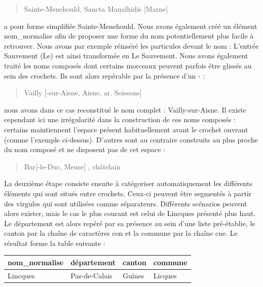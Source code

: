 \documentclass[a4paper,12pt,twoside]{book}
\begin{document}
	\begin{quotation}
		Sainte-Menehould, Sancta Manalhidis [Marne]
	\end{quotation}

	\noindent a pour forme simplifiée \og Sainte-Menehould\fg{}. Nous avons également créé un élément \og nom\_normalise\fg{} afin de proposer une forme du nom potentiellement plus facile à retrouver. Nous avons par exemple réinséré les particules devant le nom : L'entrée \og Sauvement (Le)\fg{} est ainsi transformée en \og Le Sauvement\fg{}. Nous avons également traité les noms composés dont certains morceaux peuvent parfois être glissés au sein des crochets. Ils sont alors repérable par la présence d'un \og - \fg{} : 
	
	\begin{quotation}
		Vailly [-sur-Aisne, Aisne, ar. Soissons]
	\end{quotation}
	
	\noindent nous avons dans ce cas reconstitué le nom complet : \og Vailly-sur-Aisne\fg{}. Il existe cependant ici une irrégularité dans la construction de ces noms composés : certains maintiennent l'espace présent habituellement avant le crochet ouvrant (comme l'exemple ci-dessus). D'autres sont au contraire construits au plus proche du nom composé et ne disposent pas de cet espace :
	
	\begin{quotation}
		Bar[-le-Duc, Meuse] , châtelain
	\end{quotation}
	
	La deuxième étape consiste ensuite à catégoriser automatiquement les différents éléments qui sont situés entre crochets. Ceux-ci peuvent être segmentés à partir des virgules qui sont utilisées comme séparateurs. Différents scénarios peuvent alors exister, mais le cas le plus courant est celui de \og Lincques\fg{} présenté plus haut. Le département est alors repéré par sa présence au sein d'une liste pré-établie, le canton par la chaîne de caractères \og con\fg{} et la commune par la chaîne \og cne\fg{}. Le résultat forme la table suivante :
	
	\begin{center}
		\begin{tabular}{|p{3cm}|p{3cm}|p{3cm}|p{3cm}|}
			\hline
			nom\_normalise & département & canton & commune \\ \hline
			Lincques & Pas-de-Calais & Guînes & Licques \\ \hline
		\end{tabular}
	\end{center}
	
\end{document}
